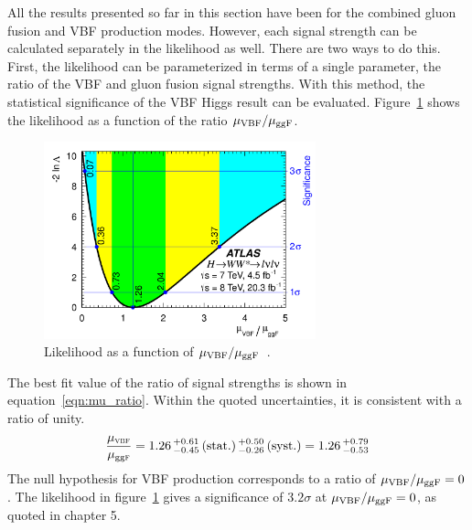 All the results presented so far in this section have been for the combined gluon fusion and VBF production modes. However, each signal strength can be calculated separately in the likelihood as well. There are two ways to do this. First, the likelihood can be parameterized in terms of a single parameter, the ratio of the VBF and gluon fusion signal strengths. With this method, the statistical significance of the VBF Higgs result can be evaluated. Figure~\ref{fig:mu_ratio} shows the likelihood as a function of the ratio $\mu_{{\rm VBF}}/\mu_{{\rm ggF}}$.

\begin{figure}[h!]
  \centering
  \captionsetup{justification=centering}

  \includegraphics[width=0.7\textwidth]{figures/WW_muratio}
  \caption{Likelihood as a function of $\mu_{{\rm VBF}}/\mu_{{\rm ggF}}$~\cite{WW2015}.}
  \label{fig:mu_ratio}
\end{figure}

The best fit value of the ratio of signal strengths is shown in equation~\ref{eqn:mu_ratio}. Within the quoted uncertainties, it is consistent with a ratio of unity. 
%
\begin{equation}
  \frac{\mu_{{\textsc{\scriptsize vbf}}}}{\mu_{{\tiny\rm gg}{\textsc{\scriptsize f}}}} 
  = 1.26\,^{+0.61}_{-0.45}\,(\rm{stat.})\,^{+0.50}_{-0.26}\,(\rm{syst.})
  = 1.26\,^{+0.79}_{-0.53} 
\label{eqn:mu_ratio}
\end{equation}
%
The null hypothesis for VBF production corresponds to a ratio of $\mu_{{\rm VBF}}/\mu_{{\rm ggF}} = 0$. The likelihood in figure~\ref{fig:mu_ratio} gives a significance of $3.2\sigma$ at $\mu_{{\rm VBF}}/\mu_{{\rm ggF}} = 0$, as quoted in chapter 5. 

